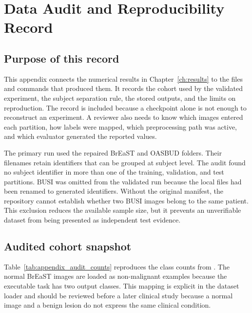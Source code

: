 \chapter[Data Audit and Reproducibility]{Data Audit and Reproducibility Record}
\label{app:app1}

\section{Purpose of this record}

This appendix connects the numerical results in Chapter~\ref{ch:results} to the files and commands that produced them. It records the cohort used by the validated experiment, the subject separation rule, the stored outputs, and the limits on reproduction. The record is included because a checkpoint alone is not enough to reconstruct an experiment. A reviewer also needs to know which images entered each partition, how labels were mapped, which preprocessing path was active, and which evaluator generated the reported values.

The primary run used the repaired BrEaST and OASBUD folders. Their filenames retain identifiers that can be grouped at subject level. The audit found no subject identifier in more than one of the training, validation, and test partitions. BUSI was omitted from the validated run because the local files had been renamed to generated identifiers. Without the original manifest, the repository cannot establish whether two BUSI images belong to the same patient. This exclusion reduces the available sample size, but it prevents an unverifiable dataset from being presented as independent test evidence.

\section{Audited cohort snapshot}

Table~\ref{tab:appendix_audit_counts} reproduces the class counts from . The normal BrEaST images are loaded as non-malignant examples because the executable task has two output classes. This mapping is explicit in the dataset loader and should be reviewed before a later clinical study because a normal image and a benign lesion do not express the same clinical condition.


